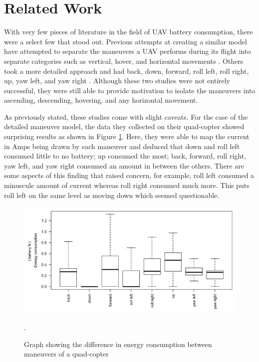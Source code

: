 \documentclass{article}
\begin{document}
\section{Related Work}
With very few pieces of literature in the field of UAV battery consumption, there were a select few that stood out. Previous attempts at creating a similar model have attempted to separate the maneuvers a UAV performs during its flight into separate categories such as vertical, hover, and horizontal movements \cite{Prasetia}. Others took a more detailed approach and had back, down, forward, roll left, roll right, up, yaw left, and yaw right \cite{Corral}. Although these two studies were not entirely successful, they were still able to provide motivation to isolate the maneuvers into ascending, descending, hovering, and any horizontal movement.\par

As previously stated, these studies come with slight caveats. For the case of the detailed maneuver model, the data they collected on their quad-copter showed surprising results as shown in Figure \ref{fig:source2}. Here, they were able to map the current in Amps being drawn by each maneuver and deduced that down and roll left consumed little to no battery; up consumed the most; back, forward, roll right, yaw left, and yaw right consumed an amount in between the others. There are some aspects of this finding that raised concern, for example, roll left consumed a minuscule amount of current whereas roll right consumed much more. This puts roll left on the same level as moving down which seemed questionable. \par

\begin{figure}[!h]
	\centering
	\includegraphics[scale=0.38]{images/source2graph.jpg}
	\caption{Graph showing the difference in energy consumption between maneuvers of a quad-copter \protect\cite{Corral}}.
	\label{fig:source2}
\end{figure}
\end{document}
